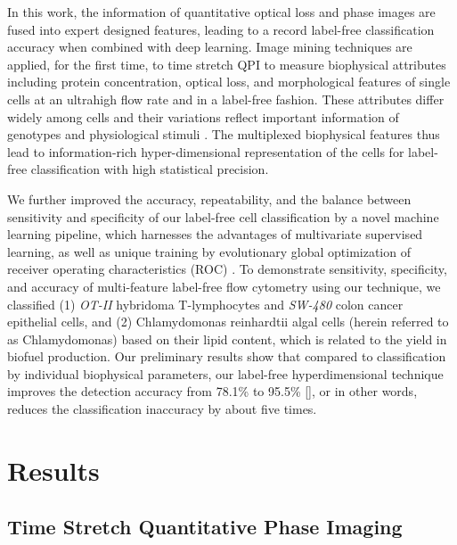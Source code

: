 \documentclass[aps,pra,reprint,longbibliography,superscriptaddress]{revtex4-1}
\begin{document}
In this work, the information of quantitative optical loss and phase images are fused into expert designed features, leading to a record label-free classification accuracy when combined with deep learning. Image mining techniques are applied, for the first time, to time stretch QPI to measure biophysical attributes including protein concentration, optical loss, and morphological features of single cells at an ultrahigh flow rate and in a label-free fashion. These attributes differ widely \cite{feinerman2008variability, sigal2006variability, friebel1999optical, vona2000isolation} among cells and their variations reflect important information of genotypes and physiological stimuli \cite{spencer2009non}. The multiplexed biophysical features thus lead to information-rich hyper-dimensional representation of the cells for label-free classification with high statistical precision. 

We further improved the accuracy, repeatability, and the balance between sensitivity and specificity of our label-free cell classification by a novel machine learning pipeline, which harnesses the advantages of multivariate supervised learning, as well as unique training by evolutionary global optimization of receiver operating characteristics (ROC) \cite{bradley1997use, powers2011evaluation, huang2005using}. To demonstrate sensitivity, specificity, and accuracy of multi-feature label-free flow cytometry using our technique, we classified (1) \textit{OT-II} hybridoma T-lymphocytes and \textit{SW-480} colon cancer epithelial cells, and (2) Chlamydomonas reinhardtii algal cells (herein referred to as Chlamydomonas) based on their lipid content, which is related to the yield in biofuel production. Our preliminary results show that compared to classification by individual biophysical parameters, our label-free hyperdimensional technique improves the detection accuracy from 78.1\% to 95.5\% [], or in other words, reduces the classification inaccuracy by about five times. 

\section{Results}
\subsection{Time Stretch Quantitative Phase Imaging}
\end{document}
